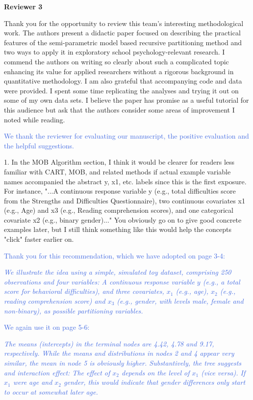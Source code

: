 \documentclass{letter}
\newcommand{\auth}[1]{\textcolor{RoyalBlue}{#1}}
\begin{document}
\textbf{Reviewer 3}

Thank you for the opportunity to review this team's interesting methodological work. The authors present a didactic paper focused on describing the practical features of the semi-parametric model based recursive partitioning method and two ways to apply it in exploratory school psychology-relevant research. I commend the authors on writing so clearly about such a complicated topic enhancing its value for applied researchers without a rigorous background in quantitative methodology. I am also grateful that accompanying code and data were provided. I spent some time replicating the analyses and trying it out on some of my own data sets. I believe the paper has promise as a useful tutorial for this audience but ask that the authors consider some areas of improvement I noted while reading.

\auth{We thank the reviewer for evaluating our manuscript, the positive evaluation and the helpful suggestions.}

1.      In the MOB Algorithm section, I think it would be clearer for readers less familiar with CART, MOB, and related methods if actual example variable names accompanied the abstract y, x1, etc. labels since this is the first exposure. For instance, "...A continuous response variable y (e.g., total difficulties score from the Strengths and Difficulties Questionnaire), two continuous covariates x1 (e.g., Age) and x3 (e.g., Reading comprehension scores), and one categorical covariate x2 (e.g., binary gender)..." You obviously go on to give good concrete examples later, but I still think something like this would help the concepts "click" faster earlier on.

\auth{Thank you for this recommendation, which we have adopted on page 3-4:}

\auth{\textit{We illustrate the idea using a simple, simulated toy dataset, comprising 250 observations and four variables: A continuous response variable $y$ (e.g., a total score for behavioral difficulties), and three covariates, $x_1$ (e.g., age), $x_2$ (e.g., reading comprehension score) and $x_3$ (e.g., gender, with levels male, female and non-binary), as possible partitioning variables.}}

\auth{We again use it on page 5-6:}

\auth{\textit{The means (intercepts) in the terminal nodes are 4.42, 4.78 and 9.17, respectively. While the means and distributions in nodes 2 and 4 appear very similar, the mean in node 5 is obviously higher. Substantively, the tree suggests and interaction effect: The effect of $x_2$ depends on the level of $x_1$ (vice versa). If $x_1$ were age and $x_2$ gender, this would indicate that gender differences only start to occur at somewhat later age.}}
\end{document}
